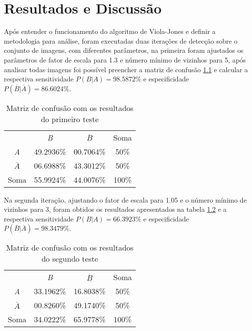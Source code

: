\chapter{Resultados e Discussão}\label{cap:resultados}

Após entender o funcionamento do algoritmo de Viola-Jones e definir a metodologia para análise, foram executadas duas iterações de detecção sobre o conjunto de imagens, com diferentes parâmetros, na primeira foram ajustados os parâmetros de fator de escala para 1.3 e número mínimo de vizinhos para 5, após analisar todas imagens foi possível preencher a matriz de confusão \ref{tab:matriz_de_confusao_teste1} e calcular a respectiva sensitividade $P(B|A) = 98.5872\%$ e especificidade $P(\overline{B} | \overline{A}) = 86.6024\%$.

\begin{table}[htbp]
    \caption{Matriz de confusão com os resultados do primeiro teste}
    \label{tab:matriz_de_confusao_teste1}
    \centering
    \begin{tabular}{cccc}\hline\hline
        & \textit{B} & $\overline{B}$ & Soma\\
    \textit{A} & 49.2936\% & 00.7064\% & 50\% \\
    $\overline{A}$ & 06.6988\% & 43.3012\% & 50\% \\
    Soma & 55.9924\% & 44.0076\% & 100\% \\
    \hline\hline
    \end{tabular}
\end{table}

Na segunda iteração, ajustando o fator de escala para 1.05 e o número mínimo de vizinhos para 3, foram obtidos os resultados apresentados na tabela \ref{tab:matriz_de_confusao_teste2} e a respectiva sensitividade $P(B|A) = 66.3923\%$ e especificidade $P(\overline{B} | \overline{A}) = 98.3479\%$.

\begin{table}[htbp]
    \caption{Matriz de confusão com os resultados do segundo teste}
    \label{tab:matriz_de_confusao_teste2}
    \centering
    \begin{tabular}{cccc}\hline\hline
        & \textit{B} & $\overline{B}$ & Soma\\
    \textit{A}& 33.1962\% & 16.8038\% & 50\% \\
    $\overline{A}$& 00.8260\% & 49.1740\% & 50\% \\
    Soma& 34.0222\% & 65.9778\% & 100\% \\
    \hline\hline
    \end{tabular}
\end{table}

